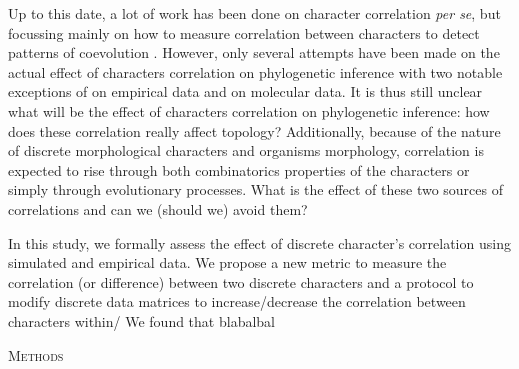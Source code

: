 \documentclass[12pt,letterpaper]{article}
\renewcommand{\section}[1]{%
\bigskip
\begin{center}
\begin{Large}
\normalfont\scshape #1
\medskip
\end{Large}
\end{center}}
\begin{document}
Up to this date, a lot of work has been done on character correlation \textit{per se}, but focussing mainly on how to measure correlation between characters to detect patterns of coevolution \citep{Lande1983,Maddison1990,Pagel1994,Pagel2006,Grabowski2016}.
However, only several attempts have been made on the actual effect of characters correlation on phylogenetic inference with two notable exceptions of \cite{Davalos01072014} on empirical data and \cite{ZouConvergence} on molecular data.
It is thus still unclear what will be the effect of characters correlation on phylogenetic inference: how does these correlation really affect topology?
Additionally, because of the nature of discrete morphological characters and organisms morphology, correlation is expected to rise through both combinatorics properties of the characters or simply through evolutionary processes.
What is the effect of these two sources of correlations and can we (should we) avoid them?

In this study, we formally assess the effect of discrete character's correlation using simulated and empirical data.
We propose a new metric to measure the correlation (or difference) between two discrete characters and a protocol to modify discrete data matrices to increase/decrease the correlation between characters within/
We found that blabalbal

\section{Methods}
\end{document}
